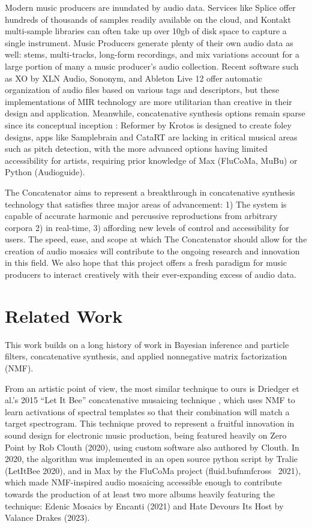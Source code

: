 \documentclass{article}
\begin{document}
Modern music producers are inundated by audio data. Services like Splice offer hundreds of thousands of samples readily available on the cloud, and Kontakt multi-sample libraries can often take up over 10gb of disk space to capture a single instrument. Music Producers generate plenty of their own audio data as well: stems, multi-tracks, long-form recordings, and mix variations account for a large portion of many a music producer's audio collection. Recent software such as XO by XLN Audio, Sononym, and Ableton Live 12 offer automatic organization of audio files based on various tags and descriptors, but these implementations of MIR technology are more utilitarian than creative in their design and application. Meanwhile, concatenative synthesis options remain sparse since its conceptual inception \cite{schwarz2000system}: Reformer by Krotos is designed to create foley designs, apps like Samplebrain and CataRT are lacking in critical musical areas such as pitch detection, with the more advanced options having limited accessibility for artists, requiring prior knowledge of Max (FluCoMa, MuBu) or Python (Audioguide).

The Concatenator aims to represent a breakthrough in concatenative synthesis technology that satisfies three major areas of advancement: 1) The system is capable of accurate harmonic and percussive reproductions from arbitrary corpora 2) in real-time, 3) affording new levels of control and accessibility for users. The speed, ease, and scope at which The Concatenator should allow for the creation of audio mosaics will contribute to the ongoing research and innovation in this field. We also hope that this project offers a fresh paradigm for music producers to interact creatively with their ever-expanding excess of audio data. 

\section{Related Work}
This work builds on a long history of work in Bayesian inference and particle filters, concatenative synthesis, and applied nonnegative matrix factorization (NMF).

From an artistic point of view, the most similar technique to ours is Driedger et al.'s 2015 ``Let It Bee'' concatenative musaicing technique \cite{driedger2015let}, which uses NMF to learn activations of spectral templates so that their combination will match a target spectrogram. This technique proved to represent a fruitful innovation in sound design for electronic music production, being featured heavily on Zero Point by Rob Clouth (2020), using custom software also authored by Clouth. In 2020, the algorithm was implemented in an open source python script by Tralie (LetItBee 2020), and in Max by the FluCoMa project (fluid.bufnmfcross~ 2021), which made NMF-inspired audio mosaicing accessible enough to contribute towards the production of at least two more albums heavily featuring the technique: Edenic Mosaics by Encanti (2021) and Hate Devours Its Host by Valance Drakes (2023).
\end{document}
